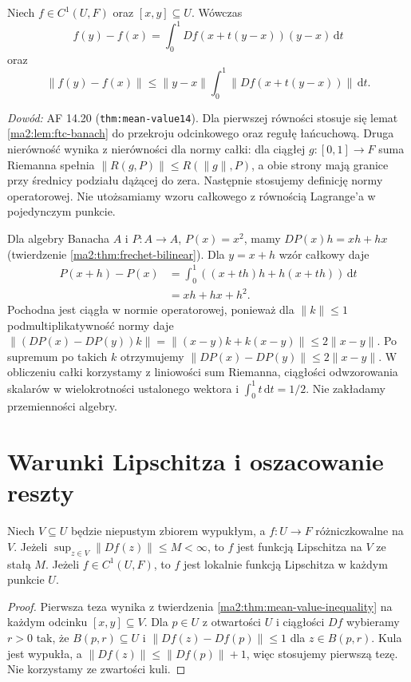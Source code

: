 \begin{twierdzenie}
\label{ma2:thm:integral-increment}
Niech $f\in C^1(U,F)$ oraz $[x,y]\subseteq U$.
Wówczas
\[
 f(y)-f(x)=\int_0^1 Df(x+t(y-x))(y-x)\,\mathrm dt
\]
oraz
\[
 \|f(y)-f(x)\|\le
 \|y-x\|\int_0^1\|Df(x+t(y-x))\|\,\mathrm dt.
\]
\end{twierdzenie}
\emph{Dowód:} AF 14.20 (\texttt{thm:mean-value14}).
Dla pierwszej równości stosuje się lemat
\ref{ma2:lem:ftc-banach} do przekroju odcinkowego
oraz regułę łańcuchową. Druga nierówność wynika
z nierówności dla normy całki: dla ciągłej
$g:[0,1]\to F$ suma Riemanna spełnia
$\|R(g,P)\|\le R(\|g\|,P)$, a obie strony mają granice
przy średnicy podziału dążącej do zera. Następnie
stosujemy definicję normy operatorowej.
Nie utożsamiamy wzoru całkowego z równością
Lagrange'a w pojedynczym punkcie.

\begin{przyklad}
Dla algebry Banacha $A$ i $P:A\to A$, $P(x)=x^2$,
mamy $DP(x)h=xh+hx$ (twierdzenie
\ref{ma2:thm:frechet-bilinear}).
Dla $y=x+h$ wzór całkowy daje
\[
 \begin{aligned}
 P(x+h)-P(x)
 &=\int_0^1 ((x+th)h+h(x+th))\,\mathrm dt\\
 &=xh+hx+h^2 .
 \end{aligned}
\]
Pochodna jest ciągła w normie operatorowej, ponieważ
dla $\|k\|\le1$ podmultiplikatywność normy daje
$\|(DP(x)-DP(y))k\|
=\|(x-y)k+k(x-y)\|\le2\|x-y\|$.
Po supremum po takich $k$ otrzymujemy
$\|DP(x)-DP(y)\|\le2\|x-y\|$. W obliczeniu całki
korzystamy z liniowości sum Riemanna, ciągłości
odwzorowania skalarów w wielokrotności ustalonego wektora i $\int_0^1t\,\mathrm dt=1/2$.
Nie zakładamy przemienności algebry.
\end{przyklad}

\section{Warunki Lipschitza i oszacowanie reszty}

\begin{wniosek}
\label{ma2:cor:derivative-lipschitz}
Niech $V\subseteq U$ będzie niepustym zbiorem wypukłym,
a $f:U\to F$ różniczkowalne na $V$. Jeżeli
$\sup_{z\in V}\|Df(z)\|\le M<\infty$, to $f$ jest
funkcją Lipschitza na $V$ ze stałą $M$.
Jeżeli $f\in C^1(U,F)$, to $f$ jest lokalnie funkcją
Lipschitza w każdym punkcie $U$.
\end{wniosek}
\begin{proof}
Pierwsza teza wynika z twierdzenia
\ref{ma2:thm:mean-value-inequality} na każdym odcinku
$[x,y]\subseteq V$. Dla $p\in U$ z otwartości $U$
i ciągłości $Df$ wybieramy $r>0$ tak, że
$B(p,r)\subseteq U$ i $\|Df(z)-Df(p)\|\le1$
dla $z\in B(p,r)$. Kula jest wypukła, a
$\|Df(z)\|\le\|Df(p)\|+1$, więc stosujemy pierwszą tezę.
Nie korzystamy ze zwartości kuli.
\end{proof}

